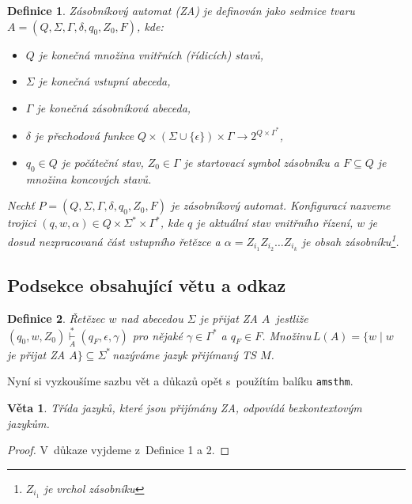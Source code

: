 \documentclass[a4paper, 11pt, twocolumn]{article}
\newtheorem{definice}{Definice}
\newtheorem{sentence}{Věta}
\begin{document}
    \begin{definice}
			\label{def:1}
			\emph{Zásobníkový automat} (ZA) je definován jako sedmice tvaru $A = (Q, \Sigma, \Gamma, \delta, q_0, Z_0, F)$, kde:
			\begin{itemize}%
					\item $Q$ je konečná množina \emph{vnitřních (řídicích) stavů},
					\item $\Sigma$ je konečná \emph{vstupní abeceda},
					\item $\Gamma$ je konečná \emph{zásobníková abeceda},
					\item $\delta$ je \emph{přechodová funkce} $Q \times (\Sigma \cup \{\epsilon \}) \times \Gamma \rightarrow 2^{Q \times \Gamma^\ast}$,
					\item $q_0 \in Q $ je \emph{počáteční stav}, $Z_0 \in \Gamma$ je \emph{startovací symbol zásobníku} a $F \subseteq Q$ je množina \emph{koncových stavů}.%
			\end{itemize}

			\emph{Nechť $P = (Q, \Sigma, \Gamma, \delta, q_0, Z_0, F)$ je zásobníkový automat}. Konfigurací \emph{nazveme trojici $(q, w, \alpha) \in Q \times \Sigma^\ast \times \Gamma^*$, kde $q$ je aktuální stav vnitřního řízení, $w$ je dosud nezpracovaná část vstupního řetězce a $\alpha = Z_{i_1} Z_{i_2}\dots Z_{i_k}$ je obsah zásobníku}\footnote{$Z_{i_1}$ je vrchol zásobníku}.
		\end{definice}

    \subsection{Podsekce obsahující větu a odkaz}
    \begin{definice}
			\label{def:2}
			\emph{Řetězec $w$ nad abecedou $\Sigma$ je přijat ZA} $A$~jestliže $(q_0, w, Z_0) \underset{A}{\overset{\ast}{\vdash}} (q_F, \epsilon, \gamma)$ pro nějaké $\gamma \in \Gamma^\ast$ a $q_F \in F$. Množinu\,$L(A) = \{w\;|\;w$ je přijat ZA $ A \} \subseteq \Sigma^\ast$\,nazýváme \emph{jazyk přijímaný TS $M$.}%
        \end{definice}
		Nyní si vyzkoušíme sazbu vět a důkazů opět s~použítím balíku \verb|amsthm|.

    \begin{sentence}
        Třída jazyků, které jsou přijímány ZA, odpovídá \emph{bezkontextovým jazykům}.
    \end{sentence}
    \begin{proof}
        V~důkaze vyjdeme z~Definice 1 a 2.
    \end{proof}
\end{document}
